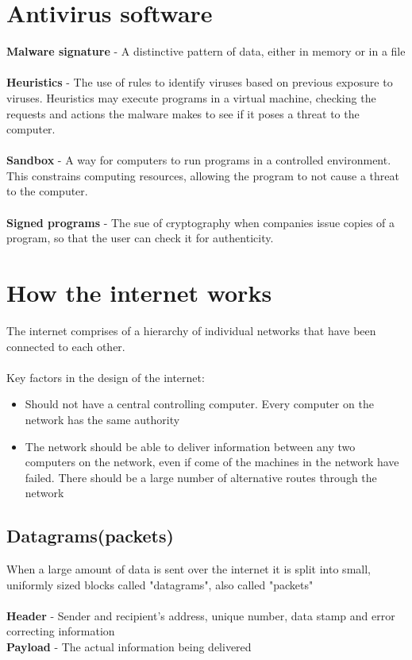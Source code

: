 \documentclass{article}[18pt]
\begin{document}
\section{Antivirus software}
\textbf{Malware signature} - A distinctive pattern of data, either in memory or in a file\\
\\
\textbf{Heuristics} - The use of rules to identify viruses based on previous exposure to viruses. Heuristics may execute programs in a virtual machine, checking the requests and actions the malware makes to see if it poses a threat to the computer.\\
\\
\textbf{Sandbox} - A way for computers to run programs in a controlled environment. This constrains computing resources, allowing the program to not cause a threat to the computer.\\
\\
\textbf{Signed programs} - The sue of cryptography when companies issue copies of a program, so that the user can check it for authenticity.
\section{How the internet works}
The internet comprises of a hierarchy of individual networks that have been connected to each other.\\
\\
Key factors in the design of the internet:
\begin{itemize}
\item Should not have a central controlling computer. Every computer on the network has the same authority
\item The network should be able to deliver information between any two computers on the network, even if come of the machines in the network have failed. There should be a large number of alternative routes through the network
\end{itemize}
\subsection{Datagrams(packets)}
When a large amount of data is sent over the internet it is split into small, uniformly sized blocks called "datagrams", also called "packets"\\
\\
\textbf{Header} - Sender and recipient's address, unique number, data stamp and error correcting information\\
\textbf{Payload} - The actual information being delivered
\end{document}
